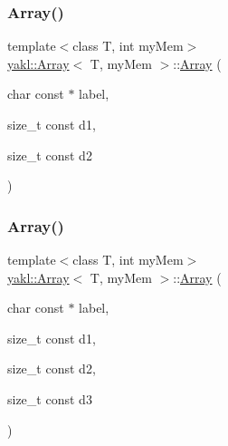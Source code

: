 \subsubsection{\texorpdfstring{Array()}{Array()}\hspace{0.1cm}{\footnotesize\ttfamily [4/12]}}
{\footnotesize\ttfamily template$<$class T, int my\+Mem$>$ \\
\hyperlink{classyakl_1_1Array}{yakl\+::\+Array}$<$ T, my\+Mem $>$\+::\hyperlink{classyakl_1_1Array}{Array} (\begin{DoxyParamCaption}\item[{char const $\ast$}]{label,  }\item[{size\+\_\+t const}]{d1,  }\item[{size\+\_\+t const}]{d2 }\end{DoxyParamCaption})\hspace{0.3cm}{\ttfamily [inline]}}

\mbox{\label{classyakl_1_1Array_a723c9cf2c1c7b2c9d780669fd301378d}} 
\subsubsection{\texorpdfstring{Array()}{Array()}\hspace{0.1cm}{\footnotesize\ttfamily [5/12]}}
{\footnotesize\ttfamily template$<$class T, int my\+Mem$>$ \\
\hyperlink{classyakl_1_1Array}{yakl\+::\+Array}$<$ T, my\+Mem $>$\+::\hyperlink{classyakl_1_1Array}{Array} (\begin{DoxyParamCaption}\item[{char const $\ast$}]{label,  }\item[{size\+\_\+t const}]{d1,  }\item[{size\+\_\+t const}]{d2,  }\item[{size\+\_\+t const}]{d3 }\end{DoxyParamCaption})\hspace{0.3cm}{\ttfamily [inline]}}

\mbox{\label{classyakl_1_1Array_a5c607dca94961c1723df1234494e5be0}} 
